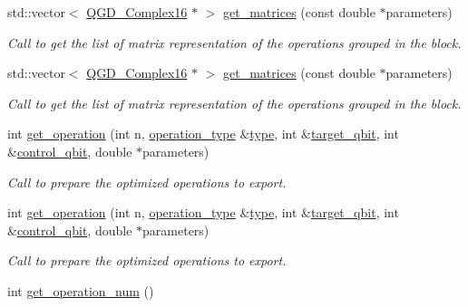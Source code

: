 \begin{DoxyCompactItemize}
std\+::vector$<$ \hyperlink{struct_q_g_d___complex16}{Q\+G\+D\+\_\+\+Complex16} $\ast$ $>$ \hyperlink{class_operation__block_af3e794fd9a409978a414af539ad23320}{get\+\_\+matrices} (const double $\ast$parameters)
\begin{DoxyCompactList}\small\item\em Call to get the list of matrix representation of the operations grouped in the block. \end{DoxyCompactList}\item 
std\+::vector$<$ \hyperlink{struct_q_g_d___complex16}{Q\+G\+D\+\_\+\+Complex16} $\ast$ $>$ \hyperlink{class_operation__block_aedddbc5242eab7c00125359a835ac53d}{get\+\_\+matrices} (const double $\ast$parameters)
\begin{DoxyCompactList}\small\item\em Call to get the list of matrix representation of the operations grouped in the block. \end{DoxyCompactList}\item 
int \hyperlink{class_decomposition___base_a64e2b692d38fe3ccbd49708d8fa24493}{get\+\_\+operation} (int n, \hyperlink{operations_2include_2_operation_8h_ad99e62941c8e4b13e5fc45ecaaf65eff}{operation\+\_\+type} \&\hyperlink{class_operation_ad47c56c86d62a4c775571e1600416479}{type}, int \&\hyperlink{class_operation_a3e489b72c124b494777c71b1646bb1e9}{target\+\_\+qbit}, int \&\hyperlink{class_operation_a9a798ea8adec5a45fd2ca07996da88e1}{control\+\_\+qbit}, double $\ast$parameters)
\begin{DoxyCompactList}\small\item\em Call to prepare the optimized operations to export. \end{DoxyCompactList}\item 
int \hyperlink{class_decomposition___base_a64e2b692d38fe3ccbd49708d8fa24493}{get\+\_\+operation} (int n, \hyperlink{operations_2include_2_operation_8h_ad99e62941c8e4b13e5fc45ecaaf65eff}{operation\+\_\+type} \&\hyperlink{class_operation_ad47c56c86d62a4c775571e1600416479}{type}, int \&\hyperlink{class_operation_a3e489b72c124b494777c71b1646bb1e9}{target\+\_\+qbit}, int \&\hyperlink{class_operation_a9a798ea8adec5a45fd2ca07996da88e1}{control\+\_\+qbit}, double $\ast$parameters)
\begin{DoxyCompactList}\small\item\em Call to prepare the optimized operations to export. \end{DoxyCompactList}\item 
int \hyperlink{class_operation__block_a27592a2d25c7e74416de2b9d7997efca}{get\+\_\+operation\+\_\+num} ()

\end{DoxyCompactItemize}
